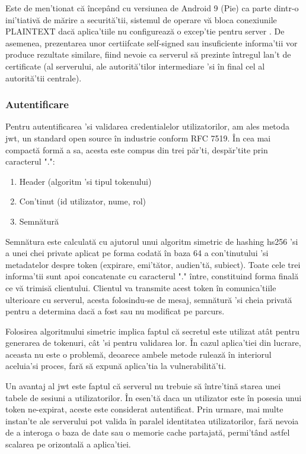 Este de men'tionat că începând cu versiunea de Android 9 (Pie) ca parte dintr-o ini'tiativă de mărire a securită'tii, sistemul de operare vă bloca conexiunile PLAINTEXT dacă aplica'tiile nu configurează o excep'tie pentru server \cite{Digicert2018}. De asemenea, prezentarea unor certiifcate self-signed sau insuficiente informa'tii vor produce rezultate similare, fiind nevoie ca serverul să prezinte întregul lan't de certificate (al serverului, ale autorită'tilor intermediare 'si în final cel al autorită'tii centrale). 

\subsubsection {Autentificare}

Pentru autentificarea 'si validarea credentialelor utilizatorilor, am ales metoda \acrfull{jwt}, un standard open source în industrie conform RFC 7519. În cea mai compactă formă a sa, acesta este compus din trei păr'ti, despăr'tite prin caracterul ".":

\begin{enumerate}
  \item Header (algoritm 'si tipul tokenului)
  \item Con'tinut (id utilizator, nume, rol)
  \item Semnătură
\end{enumerate}

Semnătura este calculată cu ajutorul unui algoritm simetric de hashing \acrfull{hs256} 'si a unei chei private aplicat pe forma codată în baza 64 a con'tinutului 'si metadatelor despre token (expirare, emi'tător, audien'tă, subiect). Toate cele trei informa'tii sunt apoi concatenate cu caracterul "." între, constituind forma finală ce vă trimisă clientului. Clientul va transmite acest token în comunica'tiile ulterioare cu serverul, acesta folosindu-se de mesaj, semnătură 'si cheia privată pentru a determina dacă a fost sau nu modificat pe parcurs.

Folosirea algoritmului simetric implica faptul că secretul este utilizat atât pentru generarea de tokenuri, cât 'si pentru validarea lor. În cazul aplica'tiei din lucrare, aceasta nu este o problemă, deoarece ambele metode rulează în interiorul aceluia'si proces, fară să expună aplica'tia la vulnerabilită'ti.

Un avantaj al \acrshort{jwt} este faptul că serverul nu trebuie să între'tină starea unei tabele de sesiuni a utilizatorilor. În esen'tă daca un utilizator este în posesia unui token ne-expirat, aceste este considerat autentificat. Prin urmare, mai multe instan'te ale serverului pot valida în paralel identitatea utilizatorilor, fară nevoia de a interoga o baza de date sau o memorie cache partajată, permi'tând astfel scalarea pe orizontală a aplica'tiei.

